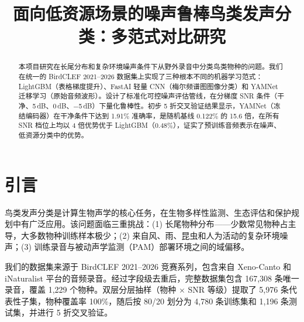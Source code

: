 \documentclass[conference]{IEEEtran}
\begin{document}
\title{面向低资源场景的噪声鲁棒鸟类发声分类：多范式对比研究}

\author{
\and
{}
\and
{}
}

\maketitle
\begin{abstract}
本项目研究在长尾分布和复杂环境噪声条件下从野外录音中分类鸟类物种的问题。我们在统一的 BirdCLEF 2021--2026 数据集上实现了三种根本不同的机器学习范式：LightGBM（表格梯度提升）、FastAI 轻量 CNN（梅尔频谱图图像分类）和 YAMNet 迁移学习（原始音频波形）。设计了标准化可控噪声评估管线，在分梯度 SNR 条件（干净、5\,dB、0\,dB、$-$5\,dB）下量化鲁棒性。初步 5 折交叉验证结果显示，YAMNet（冻结编码器）在干净条件下达到 1.91\% 准确率，是随机基线 0.122\% 的 15.6 倍，在所有 SNR 档位上均以 4 倍优势优于 LightGBM（0.48\%），证实了预训练音频表示在噪声、低资源分类中的优势。
\end{abstract}

\section{引言}
鸟类发声分类是计算生物声学的核心任务，在生物多样性监测、生态评估和保护规划中有广泛应用。该问题面临三重挑战：(1) 长尾物种分布——少数常见物种占主导，大多数物种训练样本极少；(2) 来自风、雨、昆虫和人为活动的复杂环境噪声；(3) 训练录音与被动声学监测（PAM）部署环境之间的域偏移。

我们的数据集来源于 BirdCLEF 2021--2026 竞赛系列，包含来自 Xeno-Canto 和 iNaturalist 平台的音频录音。经过字段级去重后，完整数据集包含 167,308 条唯一录音，覆盖 1,229 个物种。双层分层抽样（物种 $\times$ SNR 等级）提取了 5,976 条代表性子集，物种覆盖率 100\%，随后按 80/20 划分为 4,780 条训练集和 1,196 条测试集，并进行 5 折交叉验证。
\end{document}
